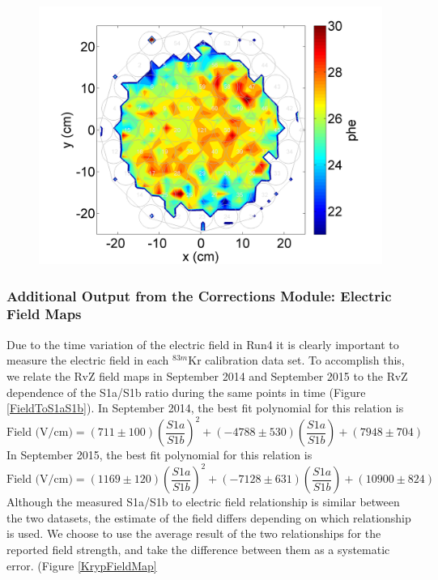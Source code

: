 \begin{figure}[!h]
\includegraphics[scale=0.5]{Run04Corrections/SEXYSizeExample.png}
 \label{SESize2}
\end{figure}

\subsubsection{Additional Output from the Corrections Module: Electric Field Maps}

Due to the time variation of the electric field in Run4 it is clearly important to measure the electric field in each $^{83m}$Kr calibration data set.  To accomplish this, we relate the RvZ field maps in September 2014 and September 2015 to the RvZ dependence of the S1a/S1b ratio during the same points in time (Figure \ref{FieldToS1aS1b}). In September 2014, the best fit polynomial for this relation is
\begin{equation}
\text{Field (V/cm)} =    (711 \pm 100) \left(\frac{S1a}{S1b} \right)^2 + (-4788 \pm 530) \left(\frac{S1a}{S1b} \right) + (7948 \pm 704)
\end{equation}
In September 2015, the best fit polynomial for this relation is
\begin{equation}
\text{Field (V/cm)} =    (1169 \pm 120) \left(\frac{S1a}{S1b} \right)^2 + (-7128 \pm 631) \left(\frac{S1a}{S1b} \right) + (10900 \pm 824)
\end{equation}
Although the measured S1a/S1b to electric field relationship is similar between the two datasets, the estimate of the field differs depending on which relationship is used.  We choose to use the average result of the two relationships for the reported field strength, and take the difference between them as a systematic error. (Figure \ref{KrypFieldMap}

